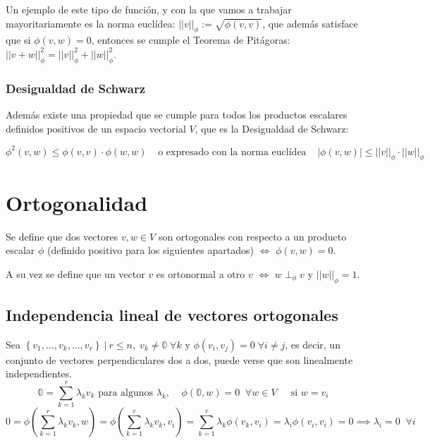 \documentclass{preset}
\begin{document}
\vspace{-10pt}
\noindent Un ejemplo de este tipo de función, y con la que vamos a trabajar mayoritariamente es la norma euclídea: $||v||_\phi:=\sqrt{\phi(v,v)}$, que además satisface que si $\phi(v,w)=0$, entonces se cumple el Teorema de Pitágoras: $||v+w||^{2}_{\phi} = ||v||^{2}_{\phi} + ||w||^{2}_{\phi}$.

\vspace{-15pt}
\subsubsection{Desigualdad de Schwarz}
Además existe una propiedad que se cumple para todos los productos escalares definidos positivos de un espacio vectorial $V$, que es la Desigualdad de Schwarz:

\vspace{-30pt}
\[\phi^2(v,w)\leq \phi(v,v) \cdot \phi(w,w)  \;\; \;\; \mbox{o expresado con la norma euclídea} \;\; \;\; |\phi(v,w)| \leq ||v||_\phi \cdot ||w||_\phi \]

\vspace{-30pt}
\section{Ortogonalidad}
Se define que dos vectores $v,w \in V$ son ortogonales con respecto a un producto escalar $\phi$ (definido positivo para los siguientes apartados) $\iff$ $\phi(v,w)=0$.

\noindent A su vez se define que un vector $v$ es ortonormal a otro $v$ $\iff$ $w \perp_\phi v$ y $||w||_\phi=1$.

\vspace{-15pt}
\subsection{Independencia lineal de vectores ortogonales}
Sea $\left\{v_1,\dots,v_k,\dots,v_r\right\}\: \vert \: r\leq n, \; v_k\neq \mathbb{0} \; \forall k \mbox{ y } \phi(v_i,v_j)=0 \; \forall i\neq j$, es decir, un conjunto de vectores perpendiculares dos a dos, puede verse que son linealmente independientes.
\[ \mathbb{0}=\sum_{k=1}^{r}{\lambda_k v_k} \mbox{ para algunos } \lambda_k, \;\;\;\; \phi(\mathbb{0},w)=0 \;\; \forall w\in V \;\;\;\; \mbox{ si } w=v_i\]
\vspace{-15pt}
\[ 0=\phi\left(\sum_{k=1}^{r}{\lambda_k v_k},w\right)=\phi\left(\sum_{k=1}^{r}{\lambda_k v_k},v_i\right)=\sum_{k=1}^{r}{\lambda_k \phi(v_k,v_i)}=\lambda_i \phi(v_i,v_i)=0\implies\lambda_i=0 \;\; \forall i\]
\end{document}
